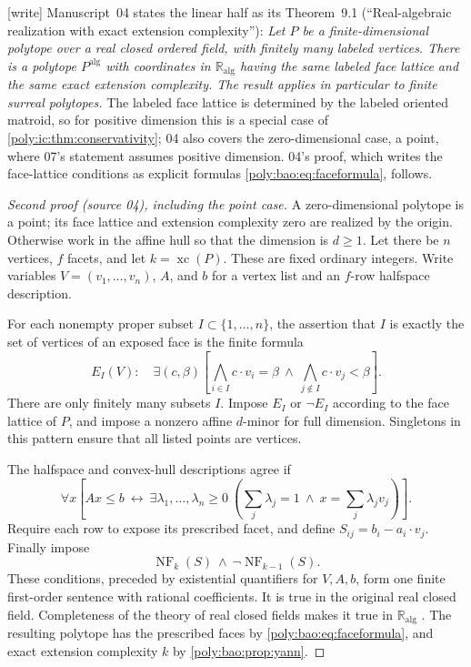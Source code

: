\documentclass[11pt,a4paper]{article}
\numberwithin{equation}{section}
\theoremstyle{plain}
\newcommand{\wtag}{\textup{[write]}}%
\newcommand{\A}{\mathbb R_{\mathrm{alg}}}
\newcommand{\xc}{\operatorname{xc}}
\newcommand{\NF}{\operatorname{NF}}
\begin{document}
\begin{remark}\label{poly:bao:rem:pointcase}
\wtag{} Manuscript~04 states the linear half as its Theorem~9.1
(``Real-algebraic realization with exact extension complexity''):
\emph{Let $P$ be a finite-dimensional polytope over a real closed ordered
field, with finitely many labeled vertices. There is a polytope
$P^{\mathrm{alg}}$ with coordinates in $\A$ having the same labeled face
lattice and the same exact extension complexity. The result applies in
particular to finite surreal polytopes.} The labeled face lattice is
determined by the labeled oriented matroid, so for positive dimension this
is a special case of \cref{poly:ic:thm:conservativity}; 04 also covers the
zero-dimensional case, a point, where 07's statement assumes positive
dimension. 04's proof, which writes the face-lattice conditions as
explicit formulas \eqref{poly:bao:eq:faceformula}, follows.
\end{remark}
\begin{proof}[Second proof (source 04), including the point case]
A zero-dimensional polytope is a point; its face lattice and extension
complexity zero are realized by the origin. Otherwise work in the affine
hull so that the dimension is $d\geq1$. Let there be $n$
vertices, $f$ facets, and let $k=\xc(P)$. These are fixed ordinary
integers. Write variables $V=(v_1,\ldots,v_n)$, $A$, and $b$ for a vertex
list and an $f$-row halfspace description.

For each nonempty proper subset $I\subset\{1,\ldots,n\}$, the assertion
that $I$ is exactly the set of vertices of an exposed face is the finite
formula
\begin{equation}\label{poly:bao:eq:faceformula}
 E_I(V):\quad\exists(c,\beta)
 \left[\bigwedge_{i\in I}c\cdot v_i=\beta\ \wedge\
       \bigwedge_{j\notin I}c\cdot v_j<\beta\right].
\end{equation}
There are only finitely many subsets $I$. Impose $E_I$ or $\neg E_I$
according to the face lattice of $P$, and impose a nonzero affine
$d$-minor for full dimension. Singletons in this pattern ensure that all
listed points are vertices.

The halfspace and convex-hull descriptions agree if
\[
 \forall x\left[
 Ax\leq b\ \longleftrightarrow\
 \exists\lambda_1,\ldots,\lambda_n\geq0\
 \left(\sum_j\lambda_j=1\ \wedge\ x=\sum_j\lambda_jv_j\right)
 \right].
\]
Require each row to expose its prescribed facet, and define
$S_{ij}=b_i-a_i\cdot v_j$. Finally impose
\[
 \NF_k(S)\ \wedge\ \neg\NF_{k-1}(S).
\]
These conditions, preceded by existential quantifiers for $V,A,b$, form
one finite first-order sentence with rational coefficients. It is true
in the original real closed field. Completeness of the theory of real
closed fields makes it true in $\A$ \cite{bao:Tarski}. The resulting
polytope has the prescribed faces by \eqref{poly:bao:eq:faceformula}, and exact
extension complexity $k$ by \cref{poly:bao:prop:yann}.
\end{proof}
\end{document}
